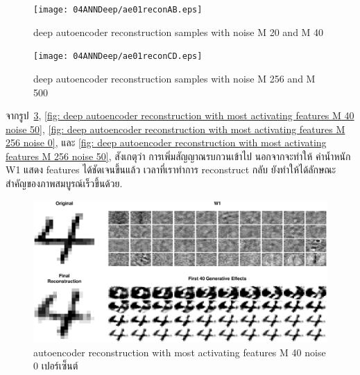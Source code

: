 %
\begin{figure}
\begin{center}
\texttt{[image: 04ANNDeep/ae01reconAB.eps]}
\end{center}
\caption{deep autoencoder reconstruction samples with noise M 20 and M 40}
\label{fig: deep autoencoder reconstruction samples with noise M 20 and M 40}
\end{figure}
%

%
\begin{figure}
\begin{center}
\texttt{[image: 04ANNDeep/ae01reconCD.eps]}
\end{center}
\caption{deep autoencoder reconstruction samples with noise M 256 and M 500}
\label{fig: deep autoencoder reconstruction samples with noise M 256 and M 500}
\end{figure}
%

จากรูป~\ref{fig: deep autoencoder reconstruction with most activating features M 40 noise 0}, \ref{fig: deep autoencoder reconstruction with most activating features M 40 noise 50}, \ref{fig: deep autoencoder reconstruction with most activating features M 256 noise 0}, และ \ref{fig: deep autoencoder reconstruction with most activating features M 256 noise 50},
สังเกตุว่า การเพิ่มสัญญาณรบกวนเข้าไป นอกจากจะทำให้ ค่าน้ำหนัก W1 แสดง features ได้ชัดเจนขึ้นแล้ว เวลาที่เราทำการ reconstruct กลับ ยังทำให้ได้ลักษณะสำคัญของภาพสมบูรณ์เร็วขึ้นด้วย.

%
\begin{figure}
\begin{center}
\includegraphics[width=6in]{04ANNDeep/ae04aGenEffects.eps}
\end{center}
\caption{autoencoder reconstruction with most activating features M 40 noise 0 เปอร์เซ็นต์}
\label{fig: deep autoencoder reconstruction with most activating features M 40 noise 0}
\end{figure}
%

